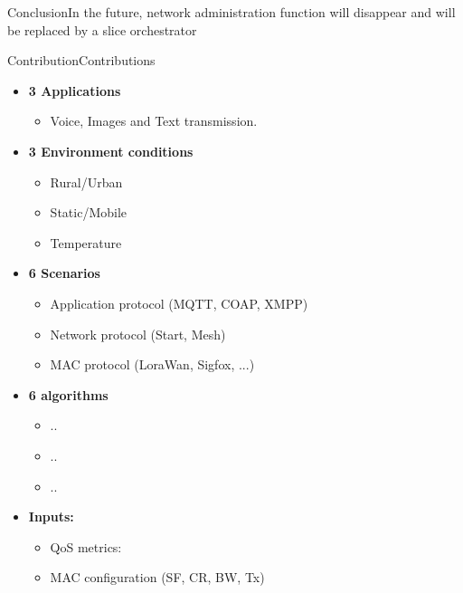 \begin{frame}{Conclusion}{In the future, network administration function will disappear and will be replaced by a slice orchestrator}
\end{frame}


\begin{frame}{Contribution}{Contributions}
	\begin{itemize}
		\item \textbf{3 Applications}
		\begin{itemize}
			\item Voice, Images and Text transmission.
		\end{itemize}
	\end{itemize}

	\begin{itemize}
		\item \textbf{3 Environment conditions}
		\begin{itemize}
			\item Rural/Urban
			\item Static/Mobile
			\item Temperature
		\end{itemize}
	\end{itemize}

	\begin{itemize}
		\item \textbf{6 Scenarios}
		\begin{itemize}
			\item Application protocol (MQTT, COAP, XMPP)
			\item Network protocol (Start, Mesh)
			\item MAC protocol (LoraWan, Sigfox, ...)
		\end{itemize}

		\item \textbf{6 algorithms}
		\begin{itemize}
			\item ..
			\item ..
			\item ..
		\end{itemize}

		\item \textbf{Inputs:}
		\begin{itemize}
			\item QoS metrics:
			\item MAC configuration (SF, CR, BW, Tx)
		\end{itemize}


\end{itemize}
\end{frame}
